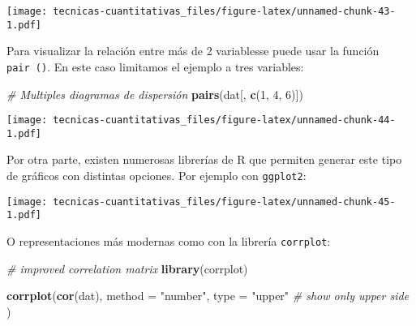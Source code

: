 \documentclass[
]{book}
\newenvironment{Shaded}{\begin{snugshade}}{\end{snugshade}}
\newcommand{\CommentTok}[1]{\textcolor[rgb]{0.56,0.35,0.01}{\textit{#1}}}
\newcommand{\DataTypeTok}[1]{\textcolor[rgb]{0.13,0.29,0.53}{#1}}
\newcommand{\DecValTok}[1]{\textcolor[rgb]{0.00,0.00,0.81}{#1}}
\newcommand{\KeywordTok}[1]{\textcolor[rgb]{0.13,0.29,0.53}{\textbf{#1}}}
\newcommand{\NormalTok}[1]{#1}
\newcommand{\OperatorTok}[1]{\textcolor[rgb]{0.81,0.36,0.00}{\textbf{#1}}}
\newcommand{\StringTok}[1]{\textcolor[rgb]{0.31,0.60,0.02}{#1}}
\begin{document}
\texttt{[image: tecnicas-cuantitativas\_files/figure-latex/unnamed-chunk-43-1.pdf]}

Para visualizar la relación entre más de 2 variablesse puede usar la función \texttt{pair\ ()}. En este caso limitamos el ejemplo a tres variables:

\begin{Shaded}
\begin{Highlighting}[]
\CommentTok{# Multiples diagramas de dispersión}
\KeywordTok{pairs}\NormalTok{(dat[, }\KeywordTok{c}\NormalTok{(}\DecValTok{1}\NormalTok{, }\DecValTok{4}\NormalTok{, }\DecValTok{6}\NormalTok{)])}
\end{Highlighting}
\end{Shaded}

\texttt{[image: tecnicas-cuantitativas\_files/figure-latex/unnamed-chunk-44-1.pdf]}

Por otra parte, existen numerosas librerías de R que permiten generar este tipo de gráficos con distintas opciones. Por ejemplo con \texttt{ggplot2}:

\begin{Shaded}
\end{Shaded}

\texttt{[image: tecnicas-cuantitativas\_files/figure-latex/unnamed-chunk-45-1.pdf]}

O representaciones más modernas como con la librería \texttt{corrplot}:

\begin{Shaded}
\begin{Highlighting}[]
\CommentTok{# improved correlation matrix}
\KeywordTok{library}\NormalTok{(corrplot)}

\KeywordTok{corrplot}\NormalTok{(}\KeywordTok{cor}\NormalTok{(dat),}
         \DataTypeTok{method =} \StringTok{"number"}\NormalTok{,}
         \DataTypeTok{type =} \StringTok{"upper"} \CommentTok{# show only upper side}
\NormalTok{         )}
\end{Highlighting}
\end{Shaded}
\end{document}

